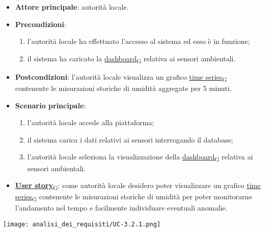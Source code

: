 \begin{itemize}
	\item \textbf{Attore principale}: autorità locale.
	\item \textbf{Precondizioni}:
	      \begin{enumerate}
		      \item l'autorità locale ha effettuato l'accesso al sistema ed esso è in funzione;
		      \item il sistema ha caricato la \href{https://7last.github.io/docs/pb/documentazione-interna/glossario\#dashboard}{dashboard\textsubscript{G}} relativa ai sensori ambientali.
	      \end{enumerate}
	\item \textbf{Postcondizioni}: l'autorità locale visualizza un grafico \href{https://7last.github.io/docs/pb/documentazione-interna/glossario\#time-series}{time series\textsubscript{G}} contenente le misurazioni storiche di umidità aggregate per 5 minuti.
	\item \textbf{Scenario principale}:
	      \begin{enumerate}
		      \item l'autorità locale accede alla piattaforma;
		      \item il sistema carica i dati relativi ai sensori interrogando il database;
		      \item l'autorità locale seleziona la visualizzazione della \href{https://7last.github.io/docs/pb/documentazione-interna/glossario\#dashboard}{dashboard\textsubscript{G}} relativa ai sensori ambientali.
	      \end{enumerate}
	\item \href{https://7last.github.io/docs/pb/documentazione-interna/glossario\#user-story}{\textbf{User story}\textsubscript{G}}:
	      come autorità locale desidero poter visualizzare un grafico \href{https://7last.github.io/docs/pb/documentazione-interna/glossario\#time-series}{time series\textsubscript{G}} contenente le misurazioni storiche
	      di umidità per poter monitorarne l'andamento nel tempo e facilmente individuare eventuali anomalie.
\end{itemize}
\begin{center}
	\texttt{[image: analisi\_dei\_requisiti/UC-3.2.1.png]}
\end{center}


